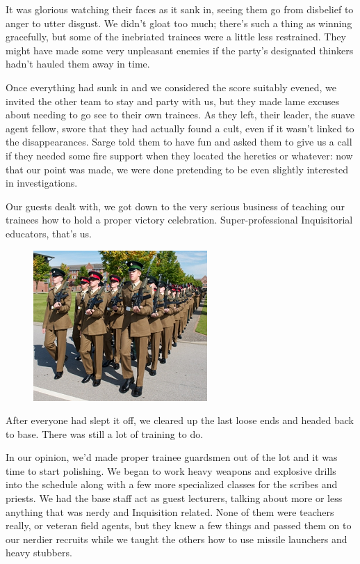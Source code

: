 It was glorious watching their faces as it sank in, seeing them go from disbelief to anger to utter disgust. 
We didn’t gloat too much; 
there’s such a thing as winning gracefully, but some of the inebriated trainees were a little less restrained. 
They might have made some very unpleasant enemies if the party’s designated thinkers hadn’t hauled them away in time.

Once everything had sunk in and we considered the score suitably evened, we invited the other team to stay and party with us, but they made lame excuses about needing to go see to their own trainees. 
As they left, their leader, the suave agent fellow, swore that they had actually found a cult, even if it wasn’t linked to the disappearances. 
Sarge told them to have fun and asked them to give us a call if they needed some fire support when they located the heretics or whatever: 
now that our point was made, we were done pretending to be even slightly interested in investigations. 


Our guests dealt with, we got down to the very serious business of teaching our trainees how to hold a proper victory celebration. 
Super-professional Inquisitorial educators, that’s us.

\begin{figure}
	\begin{center}
		\includegraphics[width=\figwidth]{pics/8/34.png}
	\end{center}
\end{figure}
After everyone had slept it off, we cleared up the last loose ends and headed back to base. 
There was still a lot of training to do.

In our opinion, we’d made proper trainee guardsmen out of the lot and it was time to start polishing. 
We began to work heavy weapons and explosive drills into the schedule along with a few more specialized classes for the scribes and priests. 
We had the base staff act as guest lecturers, talking about more or less anything that was nerdy and Inquisition related. 
None of them were teachers really, or veteran field agents, but they knew a few things and passed them on to our nerdier recruits while we taught the others how to use missile launchers and heavy stubbers.

